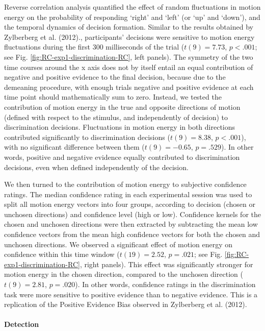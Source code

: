 \documentclass[12pt,twoside]{reedthesis}
\begin{document}
Reverse correlation analysis quantified the effect of random fluctuations in motion energy on the probability of responding `right' and `left' (or `up' and `down'), and the temporal dynamics of decision formation. Similar to the results obtained by Zylberberg et al. (2012)., participants' decisions were sensitive to motion energy fluctuations during the first 300 milliseconds of the trial (\(t(9) = 7.73\), \(p < .001\); see Fig. \ref{fig:RC-exp1-discrimination-RC}, left panels). The symmetry of the two time courses around the x axis does not by itself entail an equal contribution of negative and positive evidence to the final decision, because due to the demeaning procedure, with enough trials negative and positive evidence at each time point should mathematically sum to zero. Instead, we tested the contribution of motion energy in the true and opposite directions of motion (defined with respect to the stimulus, and independently of decision) to discrimination decisions. Fluctuations in motion energy in both directions contributed significantly to discrimination decisions (\(t(9) = 8.38\), \(p < .001\)), with no significant difference between them (\(t(9) = -0.65\), \(p = .529\)). In other words, positive and negative evidence equally contributed to discrimination decisions, even when defined independently of the decision.

We then turned to the contribution of motion energy to subjective confidence ratings. The median confidence rating in each experimental session was used to split all motion energy vectors into four groups, according to decision (chosen or unchosen directions) and confidence level (high or low). Confidence kernels for the chosen and unchosen directions were then extracted by subtracting the mean low confidence vectors from the mean high confidence vectors for both the chosen and unchosen directions. We observed a significant effect of motion energy on confidence within this time window (\(t(19) = 2.52\), \(p = .021\); see Fig. \ref{fig:RC-exp1-discrimination-RC}, right panels). This effect was significantly stronger for motion energy in the chosen direction, compared to the unchosen direction (\(t(9) = 2.81\), \(p = .020\)). In other words, confidence ratings in the discrimination task were more sensitive to positive evidence than to negative evidence. This is a replication of the Positive Evidence Bias observed in Zylberberg et al. (2012).

\hypertarget{detection}{%
\paragraph{Detection}\label{detection}}
\end{document}
